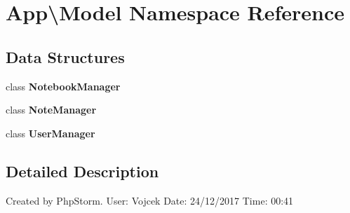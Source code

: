 \section{App\textbackslash{}Model Namespace Reference}
\label{namespace_app_1_1_model}
\subsection*{Data Structures}
\begin{DoxyCompactItemize}
\item 
class \textbf{ Notebook\+Manager}
\item 
class \textbf{ Note\+Manager}
\item 
class \textbf{ User\+Manager}
\end{DoxyCompactItemize}


\subsection{Detailed Description}
Created by Php\+Storm. User\+: Vojcek Date\+: 24/12/2017 Time\+: 00\+:41 